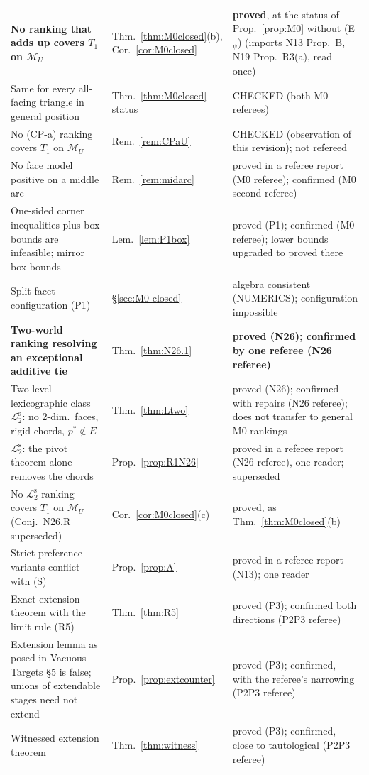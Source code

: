 \documentclass[11pt]{article}
\theoremstyle{definition}
\theoremstyle{remark}
\newcommand{\M}{\mathcal M}
\newcommand{\Ltwo}{\mathcal L_2^{\mathrm s}}
\begin{document}
{\begin{longtable}{>{\raggedright\arraybackslash}p{6.4cm}>{\raggedright\arraybackslash}p{2.1cm}>{\raggedright\arraybackslash}p{5.6cm}}
\textbf{No ranking that adds up covers $T_1$ on $\M_U$} & Thm.~\ref{thm:M0closed}(b), Cor.~\ref{cor:M0closed} & \textbf{proved}, at the status of Prop.~\ref{prop:M0} without (E$_\psi$) (imports N13 Prop.~B, N19 Prop.~R3(a), read once)\\
Same for every all-facing triangle in general position & Thm.~\ref{thm:M0closed} status & CHECKED (both M0 referees)\\
No (CP-a) ranking covers $T_1$ on $\M_U$ & Rem.~\ref{rem:CPaU} & CHECKED (observation of this revision); not refereed\\
No face model positive on a middle arc & Rem.~\ref{rem:midarc} & proved in a referee report (M0 referee); confirmed (M0 second referee)\\
One-sided corner inequalities plus box bounds are infeasible; mirror box bounds & Lem.~\ref{lem:P1box} & proved (P1); confirmed (M0 referee); lower bounds upgraded to proved there\\
Split-facet configuration (P1) & \S\ref{sec:M0-closed} & algebra consistent (NUMERICS); configuration impossible\\
\textbf{Two-world ranking resolving an exceptional additive tie} & Thm.~\ref{thm:N26.1} & \textbf{proved (N26); confirmed by one referee (N26 referee)}\\
Two-level lexicographic class $\Ltwo$: no 2-dim.\ faces, rigid chords, $p^*\notin E$ & Thm.~\ref{thm:Ltwo} & proved (N26); confirmed with repairs (N26 referee); does not transfer to general M0 rankings\\
$\Ltwo$: the pivot theorem alone removes the chords & Prop.~\ref{prop:R1N26} & proved in a referee report (N26 referee), one reader; superseded\\
No $\Ltwo$ ranking covers $T_1$ on $\M_U$ (Conj.~N26.R superseded) & Cor.~\ref{cor:M0closed}(c) & proved, as Thm.~\ref{thm:M0closed}(b)\\
Strict-preference variants conflict with (S) & Prop.~\ref{prop:A} & proved in a referee report (N13); one reader\\
Exact extension theorem with the limit rule (R5) & Thm.~\ref{thm:R5} & proved (P3); confirmed both directions (P2P3 referee)\\
Extension lemma as posed in Vacuous Targets \S5 is false; unions of extendable stages need not extend & Prop.~\ref{prop:extcounter} & proved (P3); confirmed, with the referee's narrowing (P2P3 referee)\\
Witnessed extension theorem & Thm.~\ref{thm:witness} & proved (P3); confirmed, close to tautological (P2P3 referee)\\

\end{longtable}}
\end{document}
